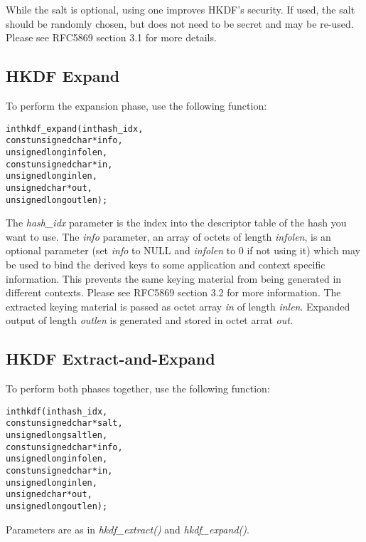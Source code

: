 \documentclass[synpaper]{book}
\begin{document}
While the salt is optional, using one improves HKDF's security. If used, the salt should be randomly chosen, but does not need to be secret and may be re-used. Please see RFC5869 section 3.1 for more details.

\subsection{HKDF Expand}
To perform the expansion phase, use the following function:

\begin{alltt}
int hkdf_expand(    int  hash_idx,
    const unsigned char *info,
          unsigned long  infolen,
    const unsigned char *in,
          unsigned long  inlen,
          unsigned char *out,
          unsigned long  outlen);
\end{alltt}

The \textit{hash\_idx} parameter is the index into the descriptor table of the hash you want to use.
The \textit{info} parameter, an array of octets of length \textit{infolen}, is an optional parameter (set \textit{info} to NULL and \textit{infolen} to 0 if not using it) which
may be used to bind the derived keys to some application and context specific information. This prevents the same keying material from being generated in different contexts. Please see RFC5869 section 3.2 for more information.
The extracted keying material is passed as octet array \textit{in} of length \textit{inlen}.  Expanded output of length \textit{outlen} is generated and stored in octet arrat \textit{out}.

\subsection{HKDF Extract-and-Expand}
To perform both phases together, use the following function:

\begin{alltt}
int hkdf(           int  hash_idx,
    const unsigned char *salt,
          unsigned long  saltlen,
    const unsigned char *info,
          unsigned long  infolen,
    const unsigned char *in,
          unsigned long  inlen,
          unsigned char *out,
          unsigned long  outlen);
\end{alltt}

Parameters are as in \textit{hkdf\_extract()} and \textit{hkdf\_expand()}.
\end{document}
